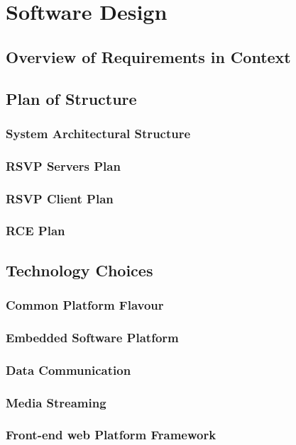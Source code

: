 \section{Software Design}
  \subsection{Overview of Requirements in Context}
  \subsection{Plan of Structure}
    \subsubsection{System Architectural Structure}
    \subsubsection{RSVP Servers Plan}
    \subsubsection{RSVP Client Plan}
    \subsubsection{RCE Plan}
  \subsection{Technology Choices}
    \subsubsection{Common Platform Flavour}
    \subsubsection{Embedded Software Platform}
    \subsubsection{Data Communication}
    \subsubsection{Media Streaming}
    \subsubsection{Front-end web Platform Framework}